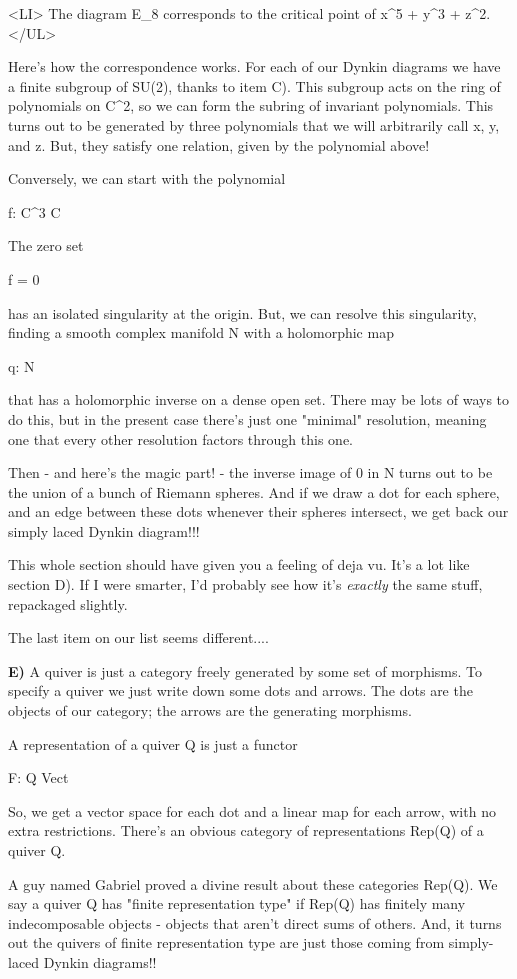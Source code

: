 <LI>
The diagram E_{8} corresponds to the critical point of x^{5} + y^{3} + z^{2}.
</UL>

Here's how the correspondence works.  For each of our Dynkin diagrams
we have a finite subgroup of SU(2), thanks to item C).  This subgroup 
acts on the ring of polynomials on C^{2}, so we can form the subring of 
invariant polynomials.  This turns out to be generated by three polynomials 
that we will arbitrarily call x, y, and z.  But, they satisfy one relation, 
given by the polynomial above!

Conversely, we can start with the polynomial

f: C^{3} \to  C

The zero set

{f = 0}

has an isolated singularity at the origin.  But, we can resolve
this singularity, finding a smooth complex manifold N with a 
holomorphic map

q: N 

that has a holomorphic inverse on a dense open set.  There may be 
lots of ways to do this, but in the present case there's just one 
"minimal" resolution, meaning one that every other resolution 
factors through this one.

Then - and here's the magic part! - the inverse image of 0 in N
turns out to be the union of a bunch of Riemann spheres.  And
if we draw a dot for each sphere, and an edge between these dots 
whenever their spheres intersect, we get back our simply laced
Dynkin diagram!!!

This whole section should have given you a feeling of deja vu.
It's a lot like section D).  If I were smarter, I'd probably see 
how it's \emph{exactly} the same stuff, repackaged slightly.  

The last item on our list seems different....

\textbf{E)} A quiver is just a category freely generated by some set of
morphisms.  To specify a quiver we just write down some dots
and arrows.  The dots are the objects of our category; the 
arrows are the generating morphisms.

A representation of a quiver Q is just a functor 

F: Q \to  Vect

So, we get a vector space for each dot and a linear map for
each arrow, with no extra restrictions.  There's an obvious
category of representations Rep(Q) of a quiver Q.

A guy named Gabriel proved a divine result about these categories
Rep(Q).  We say a quiver Q has "finite representation type"
if Rep(Q) has finitely many indecomposable objects - objects that
aren't direct sums of others.  And, it turns out the quivers of
finite representation type are just those coming from simply-laced
Dynkin diagrams!!

